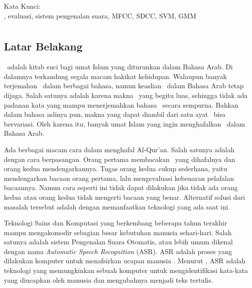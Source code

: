 \noindent Kata Kunci: \\ 
\noindent \quran, evaluasi, sistem pengenalan suara, MFCC, SDCC, SVM, GMM \\ 

\newpage%
\chapter{\babSatu}


\section{Latar Belakang}
	\quran~adalah kitab suci bagi umat Islam yang diturunkan dalam Bahasa Arab. Di dalamnya terkandung segala macam hakikat kehidupan. Walaupun banyak terjemahan \quran~dalam berbagai bahasa, namun keaslian \quran~dalam Bahasa Arab tetap dijaga. Salah satunya adalah karena makna \quran~yang begitu luas, sehingga tidak ada padanan kata yang mampu menerjemahkan bahasa \quran~secara sempurna. Bahkan dalam bahasa aslinya pun, makna yang dapat diambil dari satu ayat \quran~bisa bervariasi. Oleh karena itu, banyak umat Islam yang ingin menghafalkan \quran~dalam Bahasa Arab.
	
	Ada berbagai macam cara dalam menghafal Al-Qur'an. Salah satunya adalah dengan cara berpasangan. Orang pertama membacakan \quran~yang dihafalnya dan orang kedua mendengarkannya. Tugas orang kedua cukup sederhana, yaitu mendengarkan bacaan orang pertama, lalu mengevaluasi kebenaran pelafalan bacaannya. Namun cara seperti ini tidak dapat dilakukan jika tidak ada orang kedua atau orang kedua tidak mengerti bacaan yang benar. Alternatif solusi dari masalah tersebut adalah dengan memanfaatkan teknologi yang ada saat ini.
	
	Teknologi Sains dan Komputasi yang berkembang beberapa tahun terakhir mampu mengakomodir sebagian besar kebutuhan manusia sehari-hari. Salah satunya adalah sistem Pengenalan Suara Otomatis, atau lebih umum dikenal dengan nama \textit{Automatic Speech Recognition} (ASR).  ASR adalah proses yang dilakukan komputer untuk menafsirkan ucapan manusia \citep{forsberg2003speech}. Menurut \cite{IJIR37}, ASR adalah teknologi yang memungkinkan sebuah komputer untuk mengidentifikasi kata-kata yang diucapkan oleh manusia dan mengubahnya menjadi teks tertulis.
	

